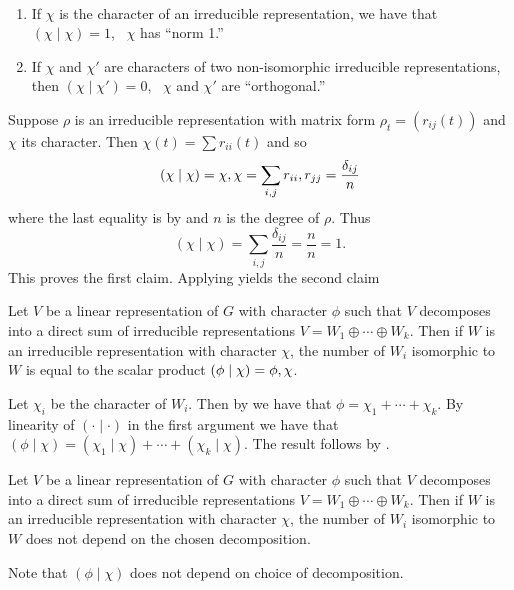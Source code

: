 \documentclass[letterpaper, 11pt, oneside]{book}
\begin{document}
\begin{thrm}\label{thrm:norm_orthogonal_characters}\
  \begin{enumerate}
  \item If $\chi$ is the character of an irreducible representation, we have that $(\chi \mid \chi) = 1$, \ie\ $\chi$ has ``norm 1.''
  \item If $\chi$ and $\chi'$ are characters of two non-isomorphic irreducible representations, then $(\chi \mid \chi') = 0$, \ie\ $\chi$ and $\chi'$ are ``orthogonal.''
  \end{enumerate}
\end{thrm}
\begin{pf}
  Suppose $\rho$ is an irreducible representation with matrix form $\rho_{t} = (r_{ij}(t))$ and $\chi$ its character.
  Then $\chi(t) = \sum r_{ii}(t)$ and so
  \[
    (\chi \mid \chi) = \inner{\chi, \chi} = \sum_{i, j} \inner{r_{ii}, r_{jj}} = \frac{\delta_{ij}}{n}
  \]
  where the last equality is by  and $n$ is the degree of $\rho$.
  Thus
  \[
    (\chi \mid \chi) = \sum_{i, j} \frac{\delta_{ij}}{n} = \frac{n}{n} = 1.
  \]
  This proves the first claim.
  Applying  yields the second claim
\end{pf}

\begin{thrm}\label{thrm:scalar_counts_num_iso}
  Let $V$ be a linear representation of $G$ with character $\phi$ such that $V$ decomposes into a direct sum of irreducible representations $V = W_{1} \oplus \cdots \oplus W_{k}$.
  Then if $W$ is an irreducible representation with character $\chi$, the number of $W_{i}$ isomorphic to $W$ is equal to the scalar product $(\phi \mid \chi) = \inner{\phi, \chi}$.
\end{thrm}
\begin{pf}
  Let $\chi_{i}$ be the character of $W_{i}$.
  Then by  we have that $\phi = \chi_{1} + \cdots + \chi_{k}$.
  By linearity of $(\cdot \mid \cdot)$ in the first argument we have that $(\phi \mid \chi) = (\chi_{1} \mid \chi) + \cdots + (\chi_{k} \mid \chi)$.
  The result follows by \Cref{thrm:norm_orthogonal_characters}.
\end{pf}

\begin{cor}
  Let $V$ be a linear representation of $G$ with character $\phi$ such that $V$ decomposes into a direct sum of irreducible representations $V = W_{1} \oplus \cdots \oplus W_{k}$.
  Then if $W$ is an irreducible representation with character $\chi$, the number of $W_{i}$ isomorphic to $W$ does not depend on the chosen decomposition.
\end{cor}
\begin{pf}
  Note that $(\phi \mid \chi)$ does not depend on choice of decomposition.
\end{pf}
\end{document}
